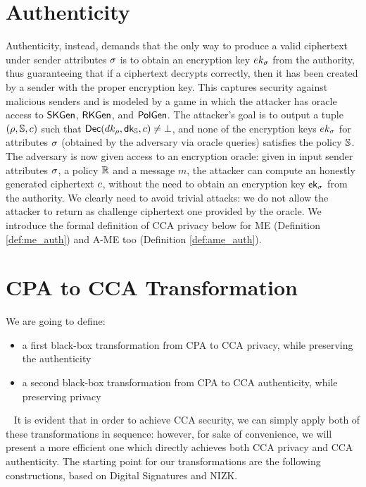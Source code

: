 \section{Authenticity}\label{sec:cca-auth}
Authenticity, instead, demands that the only way to produce a valid ciphertext under sender attributes $\sigma$ is to obtain an encryption key $ek_\sigma$ from the authority, thus guaranteeing that if a ciphertext decrypts correctly, then it has been created by a sender with the proper encryption key. This captures security against malicious senders and is modeled by a game in which the attacker has oracle access to $\mathsf{SKGen}$, $\mathsf{RKGen}$, and $\mathsf{PolGen}$.
The attacker's goal is to output a tuple $(\rho, \mathbb{S}, c)$ such that $\mathsf{Dec}(dk_\rho, \mathsf{dk}_{\mathbb{S}}, c) \not= \bot$, and none of the encryption keys $ek_\sigma$ for attributes $\sigma$ (obtained by the adversary via oracle queries) satisfies the policy $\mathbb{S}$.
\newline\newline
The adversary is now given access to an encryption oracle: given in input sender attributes $\sigma$, a policy $\mathbb{R}$ and a message $m$, the attacker can compute an honestly generated ciphertext $c$, without the need to obtain an encryption key $\mathsf{ek}_\sigma$ from the authority.
We clearly need to avoid trivial attacks: we do not allow the attacker to return as challenge ciphertext one provided by the oracle.
We introduce the formal definition of CCA privacy below for ME (Definition \ref{def:me_auth}) and A-ME too (Definition \ref{def:ame_auth}).




\section{CPA to CCA Transformation}\label{sec:cca-transformation}

We are going to define:
\begin{itemize}
    \item a first black-box transformation from CPA to CCA privacy, while preserving the authenticity
    \item a second black-box transformation from CPA to CCA authenticity, while preserving privacy
\end{itemize}
~\newline
It is evident that in order to achieve CCA security, we can simply apply both of these transformations in sequence: however, for sake of convenience, we will present a more efficient one which directly achieves both CCA privacy and CCA authenticity.
\newline\newline
The starting point for our transformations are the following constructions, based on Digital Signatures and NIZK.




